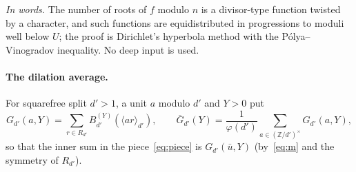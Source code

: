 \documentclass[11pt,a4paper]{article}
\theoremstyle{remark}\newtheorem{remark}[theorem]{Remark}
\newcommand{\Z}{\mathbb{Z}}\newcommand{\Q}{\mathbb{Q}}\newcommand{\F}{\mathbb{F}}\newcommand{\R}{\mathbb{R}}
\newcommand{\rep}[2]{\langle #1\rangle_{#2}}
\begin{document}
\emph{In words.} The number of roots of $f$ modulo $n$ is a divisor-type function twisted by a character, and
such functions are equidistributed in progressions to moduli well below $U$; the proof is Dirichlet's hyperbola
method with the P\'olya--Vinogradov inequality. No deep input is used.

\paragraph{The dilation average.} For squarefree split $d'>1$, a unit $a$ modulo $d'$ and $Y>0$ put
\begin{equation}\label{eq:G}
G_{d'}(a,Y)=\sum_{r\in R_{d'}}B^{(Y)}_{d'}(\rep{ar}{d'}),\qquad
\bar G_{d'}(Y)=\frac1{\varphi(d')}\sum_{a\in(\Z/d')^\times}G_{d'}(a,Y),
\end{equation}
so that the inner sum in the piece~\eqref{eq:piece} is $G_{d'}(\bar u,Y)$ (by~\eqref{eq:m} and the symmetry of $R_{d'}$).
\end{document}

